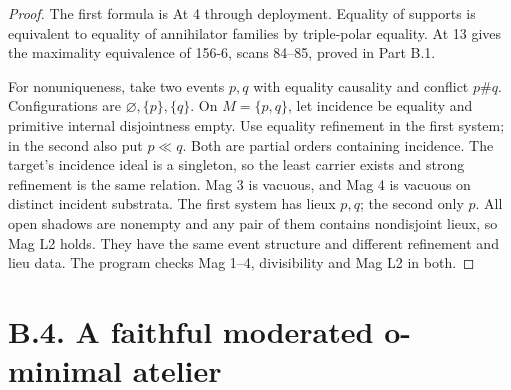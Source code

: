 \begin{proof}
The first formula is At 4 through deployment.
Equality of supports is equivalent to equality of
annihilator families by triple-polar equality.
At 13 gives the maximality equivalence of 156-6,
scans 84--85, proved in Part B.1.

For nonuniqueness, take two events \(p,q\) with
equality causality and conflict \(p\#q\).
Configurations are \(\varnothing,\{p\},\{q\}\).
On \(M=\{p,q\}\), let incidence be equality
and primitive internal disjointness empty.
Use equality refinement in the first system;
in the second also put \(p\ll q\).
Both are partial orders containing incidence.
The target's incidence ideal is a singleton,
so the least carrier exists and strong
refinement is the same relation. Mag 3 is
vacuous, and Mag 4 is vacuous on distinct
incident substrata. The first system has
lieux \(p,q\); the second only \(p\).
All open shadows are nonempty and any
pair of them contains nondisjoint lieux,
so Mag L2 holds. They have the same
event structure and different refinement
and lieu data. The program checks Mag
1--4, divisibility and Mag L2 in both.
\end{proof}


\section{B.4. A faithful moderated o-minimal atelier}

